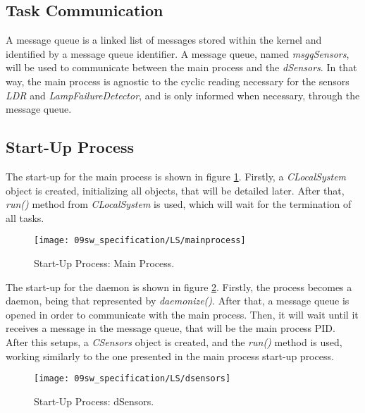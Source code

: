 \subsection{Task Communication}

A message queue is a linked list of messages stored within the kernel and identified by a message queue identifier. A message queue, named \textit{msgqSensors}, will be used to communicate between the main process and the \textit{dSensors}. In that way, the main process is agnostic to the cyclic reading necessary for the sensors \textit{LDR} and \textit{LampFailureDetector}, and is only informed when necessary, through the message queue.

\subsection{Start-Up Process}


The start-up for the main process is shown in figure \ref{fig:mainprocess}. Firstly, a \textit{CLocalSystem} object is created, initializing all objects, that will be detailed later. After that, \textit{run()} method from \textit{CLocalSystem} is used, which will wait for the termination of all tasks.

\begin{figure}[H]
	\centering
	\texttt{[image: 09sw\_specification/LS/mainprocess]}
	\caption{Start-Up Process: Main Process.}
	\label{fig:mainprocess}
\end{figure}

\clearpage
{}

The start-up for the daemon is shown in figure \ref{fig:dsensors}. Firstly, the process becomes a daemon, being that represented by \textit{daemonize()}. After that, a message queue is opened in order to communicate with the main process. Then, it will wait until it receives a message in the message queue, that will be the main process PID. After this setups, a \textit{CSensors} object is created, and the \textit{run()} method is used, working similarly to the one presented in the main process start-up process.

\begin{figure}[H]
	\centering
	\texttt{[image: 09sw\_specification/LS/dsensors]}
	\caption{Start-Up Process: dSensors.}
	\label{fig:dsensors}
\end{figure}

